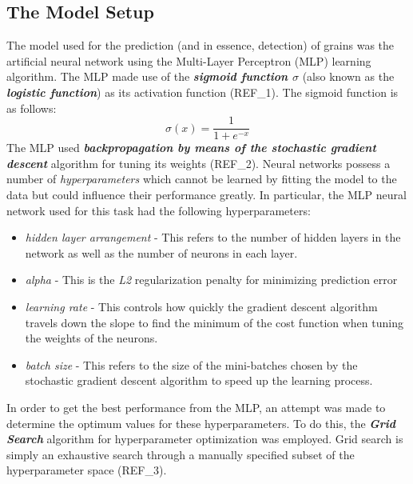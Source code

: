 \subsection{The Model Setup}
The model used for the prediction (and in essence, detection) of grains was the artificial neural network using the Multi-Layer Perceptron (MLP) learning algorithm. The MLP made use of the \textit{\textbf{sigmoid function $\sigma$}} (also known as the \textbf{\textit{logistic function}}) as its activation function (REF\_1). The sigmoid function is as follows:
\begin{equation}
\sigma(x) = \frac{1}{1 + e^{-x}}
\end{equation}
The MLP used \textit{\textbf{backpropagation by means of the stochastic gradient descent}} algorithm for tuning its weights (REF\_2). Neural networks possess a number of \textit{hyperparameters} which cannot be learned by fitting the model to the data but could influence their performance greatly. In particular, the MLP neural network used for this task had the following hyperparameters:
\begin{itemize}
\item \textit{hidden layer arrangement} - This refers to the number of hidden layers in the network as well as the number of neurons in each layer.
\item \textit{alpha} - This is the \textit{L2} regularization penalty for minimizing prediction error
\item \textit{learning rate} - This controls how quickly the gradient descent algorithm travels down the slope to find the minimum of the cost function when tuning the weights of the neurons.
\item \textit{batch size} - This refers to the size of the mini-batches chosen by the stochastic gradient descent algorithm to speed up the learning process.
\end{itemize}
In order to get the best performance from the MLP, an attempt was made to determine the optimum values for these hyperparameters. To do this, the \textit{\textbf{Grid Search}} algorithm for hyperparameter optimization was employed. Grid search is simply an exhaustive search through a manually specified subset of the hyperparameter space (REF\_3).

